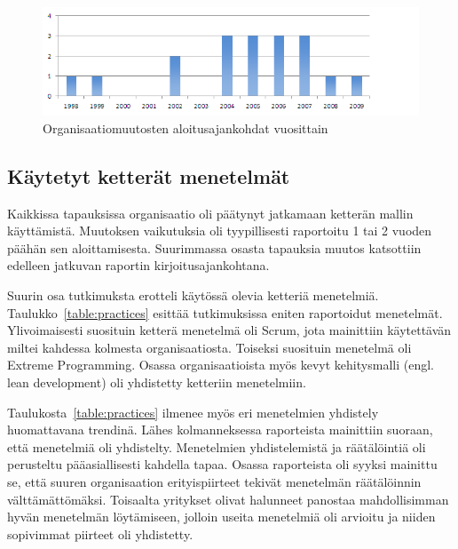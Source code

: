 \begin{figure}[htb]
  \begin{center}
    \includegraphics[width=1\textwidth]{img/Transformation_start}
    \caption{Organisaatiomuutosten aloitusajankohdat vuosittain}
    \label{fig:start_year}
  \end{center}
\end{figure}

\subsection{Käytetyt ketterät menetelmät}

Kaikkissa tapauksissa organisaatio oli päätynyt jatkamaan ketterän mallin
käyttämistä. Muutoksen vaikutuksia oli tyypillisesti raportoitu 1 tai 2 vuoden
päähän sen aloittamisesta. Suurimmassa osasta tapauksia muutos katsottiin
edelleen jatkuvan raportin kirjoitusajankohtana.

Suurin osa tutkimuksta erotteli käytössä olevia ketteriä menetelmiä.
Taulukko~\ref{table:practices} esittää tutkimuksissa eniten raportoidut
menetelmät. Ylivoimaisesti suosituin ketterä menetelmä oli Scrum, jota
mainittiin käytettävän miltei kahdessa kolmesta organisaatiosta. Toiseksi
suosituin menetelmä oli Extreme Programming. Osassa organisaatioista myös
kevyt kehitysmalli (engl. lean development) oli yhdistetty ketteriin
menetelmiin.

Taulukosta~\ref{table:practices} ilmenee myös eri menetelmien yhdistely
huomattavana trendinä. Lähes kolmanneksessa raporteista mainittiin suoraan, että
menetelmiä oli yhdistelty. Menetelmien yhdistelemistä ja räätälöintiä oli
perusteltu pääasiallisesti kahdella tapaa. Osassa raporteista oli syyksi
mainittu se, että suuren organisaation erityispiirteet tekivät menetelmän
räätälöinnin välttämättömäksi. Toisaalta yritykset olivat halunneet panostaa
mahdollisimman hyvän menetelmän löytämiseen, jolloin useita menetelmiä oli
arvioitu ja niiden sopivimmat piirteet oli yhdistetty.

